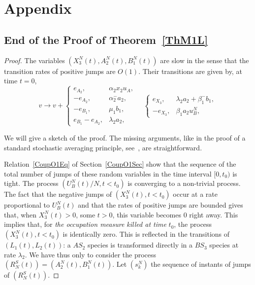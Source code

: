 \documentclass[english]{amsart}
\numberwithin{proposition}{section}
\begin{document}
\section{Appendix}
\subsection{End of the Proof of Theorem~\ref{ThM1L}}\label{O1SSec}
\begin{proof}
The variables  $(X_3^N(t),A_2^N(t),B_1^N(t))$ are slow in the sense that the transition rates of positive jumps are $O(1)$. Their transitions are given by, at time $t{=}0$, 
\begin{equation}\label{O1SHEq2}
v{\longrightarrow}   v{+} \begin{cases}
\scriptstyle{e_{A_2}}, &\scriptstyle{\alpha_2x_2u_A},\\
\scriptstyle{{-}e_{A_2}}, &\scriptstyle{\alpha_2^-a_2},\\
\scriptstyle{{-}e_{B_1}}, &\scriptstyle{\mu_1b_1},\\
\scriptstyle{e_{B_1}{-}e_{A_2}}, &\scriptstyle{\lambda_2a_2},
\end{cases}
\quad
\begin{cases}
\scriptstyle{e_{X_3}}, &\scriptstyle{\lambda_2a_2{+}\beta_1^-b_1},\\
\scriptstyle{{-}e_{X_3}}, &\scriptstyle{\beta_1a_2u_B^N},
\end{cases}
\end{equation}

We will give a sketch of the proof. The missing arguments, like in the proof of a standard stochastic averaging principle, see~\citet{Kurtz1992}, are straightforward. 

Relation~\eqref{CoupO1Eq} of Section~\ref{CoupO1Sec} show that  the sequence of the  total number of jumps of these random variables in the time interval $[0,t_0)$ is tight.
The process  $(U_B^N(t)/N,t{<}t_0)$ is converging to a non-trivial process. The fact that the negative jumps of $(X_3^N(t),t{<}t_0)$ occur at a rate proportional to $U_B^N(t)$ and that the rates of positive jumps are bounded  gives that, when $X_3^N(t){>}0$, some $t{>}0$, this variable becomes $0$ right away.  This implies that, for {\em the occupation measure killed at time} $t_0$,  the process $(X_3^N(t),t{<}t_0)$ is  identically zero. This is reflected in the transitions of $(L_1(t),L_2(t))$:  a ${ AS}_2$ species is transformed directly in a ${ BS}_3$ species at rate $\lambda_2$. We have thus only to consider the process $(R^S_N(t)){=}(A_2^N(t),B_1^N(t))$.  Let $(s_k^N)$ the sequence of instants of jumps of $(R^S_N(t))$.


\end{proof}
\end{document}
